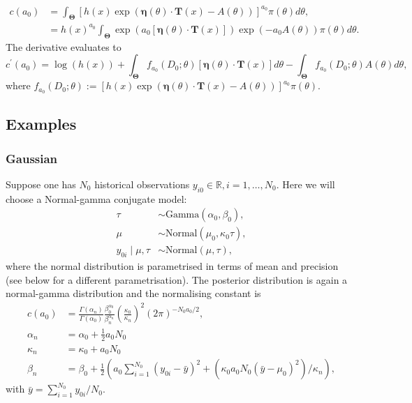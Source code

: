 \documentclass[a4paper, notitlepage, 11pt]{article}
\begin{document}
\begin{align}
 \label{eq:expo_family_const}
 c(a_0) &=  \int_{\boldsymbol\Theta} \left[ h(x)\exp\left( \boldsymbol\eta(\theta) \cdot \boldsymbol T(x) - A(\theta) \right) \right]^{a_0}\pi(\theta) d\theta, \\
 &= h(x)^{a_0}\int_{\boldsymbol\Theta} \exp \left( a_0 [\boldsymbol\eta(\theta) \cdot \boldsymbol T(x)] \right) \exp\left( - a_0 A(\theta) \right) \pi(\theta) d\theta.
\end{align}
The derivative evaluates to 
\begin{equation}
 c^\prime(a_0) = \log(h(x)) + \int_{\boldsymbol\Theta} f_{a_0}(D_0; \theta) \left[  \boldsymbol\eta(\theta) \cdot \boldsymbol T(x) \right] d\theta -  \int_{\boldsymbol\Theta} f_{a_0}(D_0; \theta)  A(\theta) d\theta,
\end{equation}
where $f_{a_0}(D_0; \theta) := \left[ h(x)\exp\left( \boldsymbol\eta(\theta) \cdot \boldsymbol T(x) - A(\theta) \right) \right]^{a_0}\pi(\theta)$.

\subsection*{Examples}
\subsubsection*{Gaussian}
Suppose one has $N_0$ historical observations $y_{i0} \in \mathbb{R}, i = 1, \ldots, N_0$.
Here we will choose a Normal-gamma conjugate model:
\begin{align*}
 \tau &\sim \text{Gamma}(\alpha_0, \beta_0),\\
 \mu &\sim \text{Normal}(\mu_0, \kappa_0\tau ),\\
 y_{0i} \mid \mu, \tau &\sim \text{Normal}(\mu, \tau),
\end{align*}
where the normal distribution is parametrised in terms of mean and precision (see below for a different parametrisation).
The posterior distribution is again a normal-gamma distribution and the normalising constant is
\begin{align}
 \label{eq:cA0_gaussian}
 c(a_0) &= \frac{\Gamma(\alpha_n)}{\Gamma(\alpha_0)}\frac{\beta_0^{\alpha_0}}{\beta_n^{\alpha_n}} \left(\frac{\kappa_0}{\kappa_n} \right)^2 (2\pi)^{-N_0 a_0/2},\\
 \alpha_n &= \alpha_0 + \frac{1}{2}a_0N_0 \\
 \kappa_n &= \kappa_0 + a_0N_0 \\
 \beta_n  &= \beta_0 + \frac{1}{2}\left( a_0\sum_{i=1}^{N_0}(y_{0i}-\bar{y})^2 + \left(\kappa_0 a_0 N_0 (\bar{y}-\mu_0)^2\right)/\kappa_n \right),
\end{align}
with $\bar{y} = \sum_{i=1}^{N_0} y_{0i}/N_0$.
\end{document}
